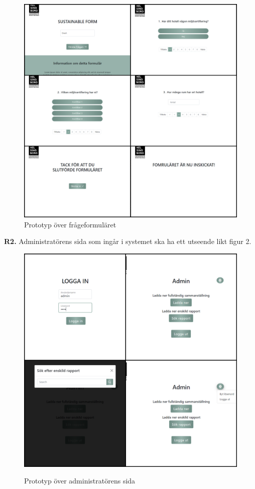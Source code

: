 \documentclass{article}
\begin{document}
    \begin{figure}[h!]
    \caption{Prototyp över frågeformuläret}
    \includegraphics[width=140mm]{Proto-Coll-Q (1).jpg}
    \end{figure}
    \newpage
    \large{\textbf{R2.}}
    Administratörens sida som ingår i systemet ska ha ett utseende likt figur 2.
    \begin{figure}[h!]
        \centering
        \caption{Prototyp över administratörens sida}
        \includegraphics[width=140mm]{Proto-Coll-A.jpg}
        \label{fig:my_label}
    \end{figure}
\newpage
    
\end{document}
